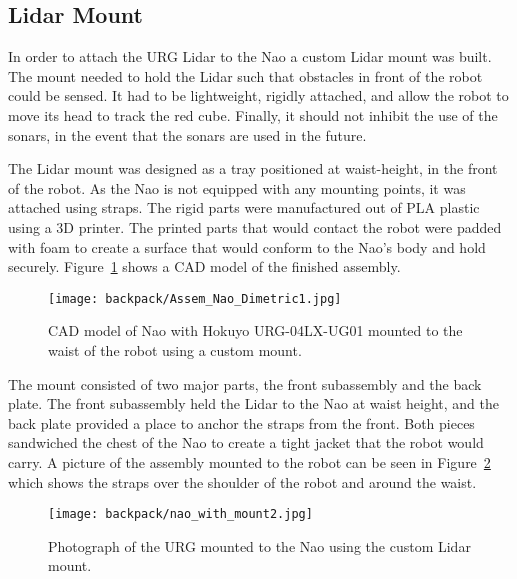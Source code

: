 \subsection{Lidar Mount}
In order to attach the URG Lidar to the Nao a custom Lidar mount was built.
The mount needed to hold the Lidar such that obstacles in front of the robot
could be sensed. It had to be lightweight, rigidly attached, and allow
the robot to move its head to track the red cube. Finally, it should not inhibit
the use of the sonars, in the event that the sonars are used in the future.

The Lidar mount was designed as a tray positioned at waist-height, 
in the front of the robot.
As the Nao is not equipped with any mounting points, it was attached
using straps. The rigid parts were manufactured out of PLA plastic using a 3D
printer. The printed parts that would contact the robot were padded with foam to
create a surface that would conform to the Nao's body and hold securely.
Figure~\ref{fig:nao_lidar_mount_nao_dimetric1} shows a CAD model of the finished
assembly.

\begin{figure}
\centering
\texttt{[image: backpack/Assem\_Nao\_Dimetric1.jpg]}
\caption{CAD model of Nao with Hokuyo URG-04LX-UG01 mounted
         to the waist of the robot using a custom mount.}
\label{fig:nao_lidar_mount_nao_dimetric1}
\end{figure}

The mount consisted of two major parts, the front subassembly and the back plate.
The front subassembly held the Lidar to the Nao at waist height, and the back plate
provided a place to anchor the straps from the front. Both pieces sandwiched the
chest of the Nao to create a tight jacket that the robot would carry.
A picture of the assembly mounted to the robot can be seen in
Figure~\ref{fig:nao_lidar_mount_picture1} which shows the straps over the
shoulder of the robot and around the waist.

\begin{figure}
\centering
\texttt{[image: backpack/nao\_with\_mount2.jpg]}
\caption{Photograph of the URG mounted to the Nao using the
         custom Lidar mount.}
\label{fig:nao_lidar_mount_picture1}
\end{figure}

